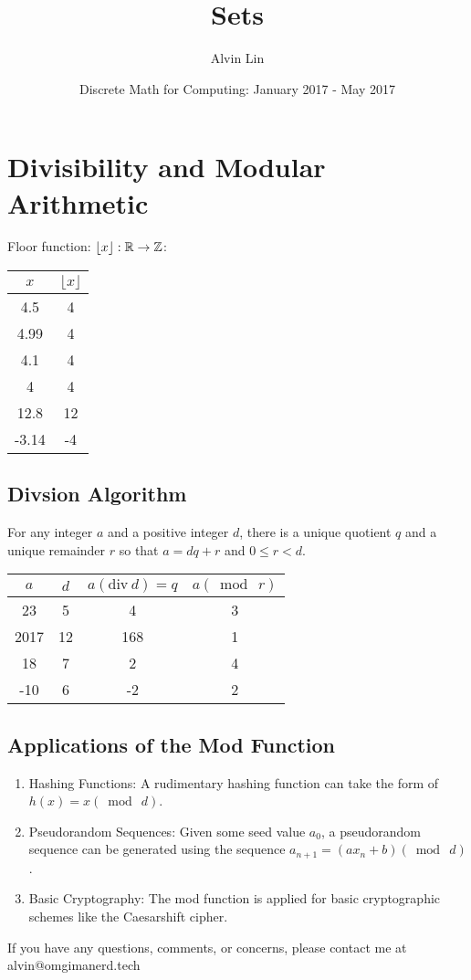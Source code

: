 \documentclass[letterpaper, 12pt]{math}
\title{Sets}
\author{Alvin Lin}
\date{Discrete Math for Computing: January 2017 - May 2017}
\begin{document}
\maketitle

\section*{Divisibility and Modular Arithmetic}
Floor function: \( \lfloor x\rfloor:\mathbb{R}\to\mathbb{Z} \):
\begin{center}
  \begin{tabular}{|c|c|}
    \hline
    \( x \) & \( \lfloor x\rfloor \) \\
    \hline
    4.5 & 4 \\
    \hline
    4.99 & 4 \\
    \hline
    4.1 & 4 \\
    \hline
    4 & 4 \\
    \hline
    12.8 & 12 \\
    \hline
    -3.14 & -4 \\
    \hline
  \end{tabular}
\end{center}

\subsection*{Divsion Algorithm}
For any integer \( a \) and a positive integer \( d \), there is a unique
quotient \( q \) and a unique remainder \( r \) so that \( a = dq+r \) and
\( 0\leq r<d \).
\begin{center}
  \begin{tabular}{|c|c|c|c|}
    \hline
    \( a \) & \( d \) & \( a(\mathrm{div}\ d) = q \) & \( a(\bmod\ r) \) \\
    \hline
    23 & 5 & 4 & 3 \\
    \hline
    2017 & 12 & 168 & 1 \\
    \hline
    18 & 7 & 2 & 4 \\
    \hline
    -10 & 6 & -2 & 2 \\
    \hline
  \end{tabular}
\end{center}

\subsection*{Applications of the Mod Function}
\begin{enumerate}
  \item Hashing Functions: A rudimentary hashing function can take the form of
    \( h(x) = x(\bmod\ d) \).
  \item Pseudorandom Sequences: Given some seed value \( a_{0} \), a
    pseudorandom sequence can be generated using the sequence
    \( a_{n+1} = (ax_{n}+b) (\bmod\ d) \).
  \item Basic Cryptography: The mod function is applied for basic cryptographic
    schemes like the Caesarshift cipher.
\end{enumerate}

\begin{center}
  If you have any questions, comments, or concerns, please contact me at
  alvin@omgimanerd.tech
\end{center}
\end{document}
